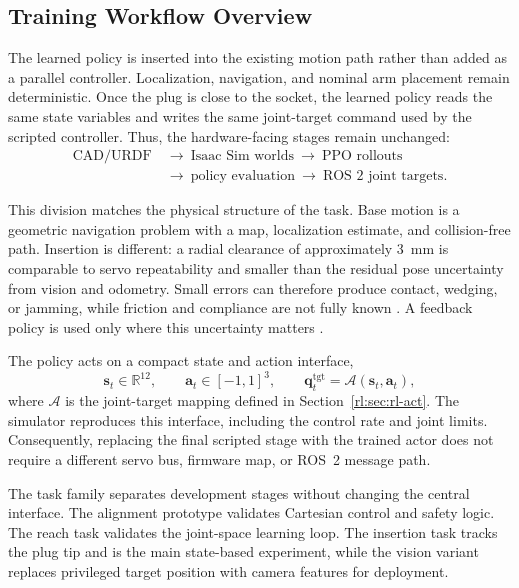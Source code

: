 \subsection{Training Workflow Overview}\label{rl:sec:rl-overview}

The learned policy is inserted into the existing motion path rather than added as a parallel controller. Localization, navigation, and nominal arm placement remain deterministic. Once the plug is close to the socket, the learned policy reads the same state variables and writes the same joint-target command used by the scripted controller. Thus, the hardware-facing stages remain unchanged:
\begin{equation*}
\begin{aligned}
\text{CAD/URDF}\ &\longrightarrow\ \text{Isaac Sim worlds}\ \longrightarrow\ \text{PPO rollouts}\\
&\longrightarrow\ \text{policy evaluation}\ \longrightarrow\ \text{ROS~2 joint targets}.
\end{aligned}
\end{equation*}

This division matches the physical structure of the task. Base motion is a geometric navigation problem with a map, localization estimate, and collision-free path. Insertion is different: a radial clearance of approximately \SI{3}{\milli\meter} is comparable to servo repeatability and smaller than the residual pose uncertainty from vision and odometry. Small errors can therefore produce contact, wedging, or jamming, while friction and compliance are not fully known \cite{whitney_1982_quasistatic,xu_2019_pegsurvey}. A feedback policy is used only where this uncertainty matters \cite{johannink_2019_residual,schoettler_2020_industrial,tang_2023_industreal}.

The policy acts on a compact state and action interface,
\begin{equation*}
\bm{s}_t\in\mathbb{R}^{12},\qquad \bm{a}_t\in[-1,1]^3,\qquad
\bm{q}^{\mathrm{tgt}}_t=\mathcal{A}(\bm{s}_t,\bm{a}_t),
\end{equation*}
where $\mathcal{A}$ is the joint-target mapping defined in Section~\ref{rl:sec:rl-act}. The simulator reproduces this interface, including the control rate and joint limits. Consequently, replacing the final scripted stage with the trained actor does not require a different servo bus, firmware map, or ROS~2 message path.

The task family separates development stages without changing the central interface. The alignment prototype validates Cartesian control and safety logic. The reach task validates the joint-space learning loop. The insertion task tracks the plug tip and is the main state-based experiment, while the vision variant replaces privileged target position with camera features for deployment.

